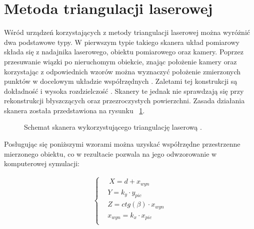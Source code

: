 \section{Metoda triangulacji laserowej}
Wśród urządzeń korzystających z metody triangulacji laserowej można wyróżnić dwa podstawowe typy. W pierwszym typie takiego skanera układ pomiarowy składa się z nadajnika laserowego, obiektu pomiarowego oraz kamery. Poprzez przesuwanie wiązki po nieruchomym obiekcie, znając położenie kamery oraz korzystając z odpowiednich wzorów można wyznaczyć położenie zmierzonych punktów w docelowym układzie współrzędnych \cite{mikulski2013metody}. Zaletami tej konstrukcji są dokładność i wysoka rozdzielczość \cite{nowacki2018pomiar}. Skanery te jednak nie sprawdzają się przy rekonstrukcji błyszczących oraz przezroczystych powierzchni. Zasada działania skanera została przedstawiona na rysunku ~\ref{fig:triangPic}. 

\begin{figure}[H]
  \centering
%   
    
  

  \caption{Schemat skanera wykorzystującego triangulację laserową \cite{mikulski2013metody}.}   
  \label{fig:triangPic}
\end{figure}
\newpage 
Posługując się poniższymi wzorami można uzyskać współrzędne przestrzenne mierzonego obiektu, co w rezultacie pozwala na jego odwzorowanie w komputerowej symulacji:

\begin{equation}
    \begin{aligned} 
    \begin{cases}
        & \ X=d+x_{wyn} \\
      & Y=k_{y}\cdot y_{pic} \\ 
      & Z=ctg(\beta) \cdot x_{wyn}\\
      &  x_{wyn}=k_{x}\cdot x_{pic}\\ 
    \end{cases}
            
    \end{aligned}
\end{equation}

